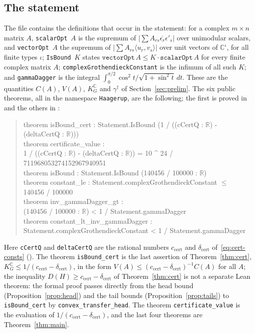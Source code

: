 \documentclass[11pt,reqno]{amsart}
\theoremstyle{definition}
\numberwithin{equation}{section}
\newcommand{\C}{\mathbb{C}}
\newcommand{\R}{\mathbb{R}}
\newcommand{\KGC}{K_G^{\C}}
\newcommand{\gd}{\gamma^\dagger}
\newcommand{\ccert}{c_{\mathrm{cert}}}
\newcommand{\dcert}{\delta_{\mathrm{cert}}}
\begin{document}
\subsection{The statement}
The file  contains the definitions that occur in the statement: for a complex $m\times n$ matrix $A$, \texttt{scalarOpt}~$A$ is the supremum of $|\sum A_{rs}\overline{\epsilon_r}\epsilon'_s|$ over unimodular scalars, and \texttt{vectorOpt}~$A$ the supremum of $|\sum A_{rs}\langle u_r,v_s\rangle|$ over unit vectors of $\C^\iota$, for all finite types $\iota$; \texttt{IsBound}~$K$ states $\texttt{vectorOpt}\,A\le K\cdot\texttt{scalarOpt}\,A$ for every finite complex matrix $A$; \texttt{complexGrothendieckConstant} is the infimum of all such $K$; and \texttt{gammaDagger} is the integral $\int_0^{\pi/2}\cos^2t/\sqrt{1+\sin^2t}\,dt$. These are the quantities $C(A)$, $V(A)$, $\KGC$ and $\gd$ of Section~\ref{sec:prelim}. The six public theorems, all in the namespace \texttt{Haagerup}, are the following; the first is proved in  and the others in :
\begin{quote}\footnotesize\ttfamily
theorem isBound\_cert : Statement.IsBound (1 / ((cCertQ : $\R$) - (deltaCertQ : $\R$)))\\[2pt]
theorem certificate\_value :\\
\hspace*{2em}1 / ((cCertQ : $\R$) - (deltaCertQ : $\R$)) = 10 \^{} 24 / 711968053274152967940951\\[2pt]
theorem isBound : Statement.IsBound (140456 / 100000 : $\R$)\\[2pt]
theorem constant\_le : Statement.complexGrothendieckConstant $\le$ 140456 / 100000\\[2pt]
theorem inv\_gammaDagger\_gt :\\
\hspace*{2em}(140456 / 100000 : $\R$) < 1 / Statement.gammaDagger\\[2pt]
theorem constant\_lt\_inv\_gammaDagger :\\
\hspace*{2em}Statement.complexGrothendieckConstant < 1 / Statement.gammaDagger
\end{quote}
Here \texttt{cCertQ} and \texttt{deltaCertQ} are the rational numbers $\ccert$ and $\dcert$ of~\eqref{eq:cert-consts} (). The theorem \texttt{isBound\_cert} is the last assertion of Theorem~\ref{thm:cert}, $\KGC\le1/(\ccert-\dcert)$, in the form $V(A)\le(\ccert-\dcert)^{-1}C(A)$ for all $A$; the inequality $D(H)\ge\ccert-\dcert$ of Theorem~\ref{thm:cert} is not a separate Lean theorem: the formal proof passes directly from the head bound (Proposition~\ref{prop:head}) and the tail bounds (Proposition~\ref{prop:tails}) to \texttt{isBound\_cert} by \texttt{convex\_transfer\_head}. The theorem \texttt{certificate\_value} is the evaluation of $1/(\ccert-\dcert)$, and the last four theorems are Theorem~\ref{thm:main}.
\end{document}
